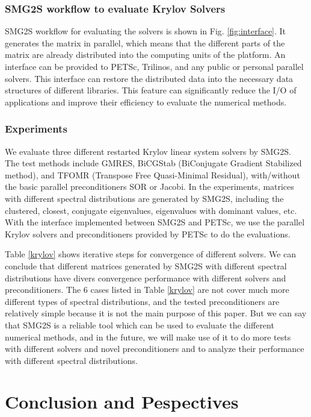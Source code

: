 \subsubsection{SMG2S workflow to evaluate Krylov Solvers}

SMG2S workflow for evaluating the solvers is shown in Fig. \ref{fig:interface}. It generates the matrix in parallel, which means that the different parts of the matrix are already distributed into the computing units of the platform. An interface can be provided to PETSc, Trilinos, and any public or personal parallel solvers. This interface can restore the distributed data into the necessary data structures of different libraries. This feature can significantly reduce the I/O of applications and improve their efficiency to evaluate the numerical methods.

\subsubsection{Experiments}

We evaluate three different restarted Krylov linear system solvers by SMG2S. The test methods include GMRES, BiCGStab (BiConjugate Gradient Stabilized method), and TFOMR (Transpose Free Quasi-Minimal Residual), with/without the basic parallel preconditioners SOR or Jacobi. In the experiments, matrices with different spectral distributions are generated by SMG2S, including the clustered, closest, conjugate eigenvalues, eigenvalues with dominant values, etc. With the interface implemented between SMG2S and PETSc, we use the parallel Krylov solvers and preconditioners provided by PETSc to do the evaluations.

Table \ref{krylov} shows iterative steps for convergence of different solvers. We can conclude that different matrices generated by SMG2S with different spectral distributions have divers convergence performance with different solvers and preconditioners. The 6 cases listed in Table \ref{krylov} are not cover much more different types of spectral distributions, and the tested preconditioners are relatively simple because it is not the main purpose of this paper. But we can say that SMG2S is a reliable tool which can be used to evaluate the different numerical methods, and in the future, we will make use of it to do more tests with different solvers and novel preconditioners and to analyze their performance with different spectral distributions.

\section{Conclusion and Pespectives}\label{conclusion}

